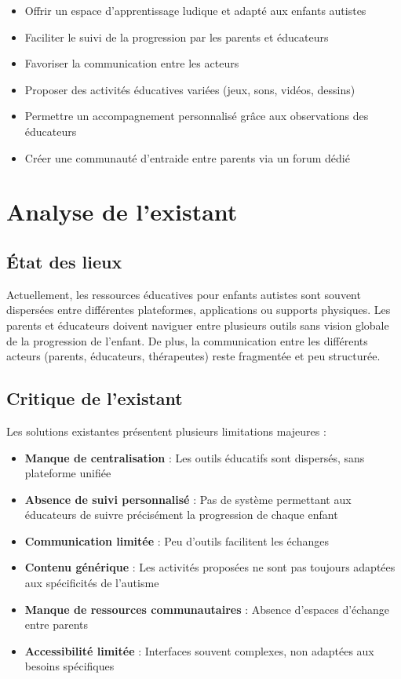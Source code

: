 \documentclass[12pt,a4paper]{report}
\begin{document}
\begin{itemize}
    \item Offrir un espace d'apprentissage ludique et adapté aux enfants autistes
    \item Faciliter le suivi de la progression par les parents et éducateurs
    \item Favoriser la communication entre les acteurs
    \item Proposer des activités éducatives variées (jeux, sons, vidéos, dessins)
    \item Permettre un accompagnement personnalisé grâce aux observations des éducateurs
    \item Créer une communauté d'entraide entre parents via un forum dédié
\end{itemize}

\section{Analyse de l'existant}

\subsection{État des lieux}

Actuellement, les ressources éducatives pour enfants autistes sont souvent dispersées entre différentes plateformes, applications ou supports physiques. Les parents et éducateurs doivent naviguer entre plusieurs outils sans vision globale de la progression de l'enfant. De plus, la communication entre les différents acteurs (parents, éducateurs, thérapeutes) reste fragmentée et peu structurée.

\subsection{Critique de l'existant}

Les solutions existantes présentent plusieurs limitations majeures :

\begin{itemize}
    \item \textbf{Manque de centralisation} : Les outils éducatifs sont dispersés, sans plateforme unifiée
    \item \textbf{Absence de suivi personnalisé} : Pas de système permettant aux éducateurs de suivre précisément la progression de chaque enfant
    \item \textbf{Communication limitée} : Peu d'outils facilitent les échanges
    \item \textbf{Contenu générique} : Les activités proposées ne sont pas toujours adaptées aux spécificités de l'autisme
    \item \textbf{Manque de ressources communautaires} : Absence d'espaces d'échange entre parents
    \item \textbf{Accessibilité limitée} : Interfaces souvent complexes, non adaptées aux besoins spécifiques
\end{itemize}
\end{document}
